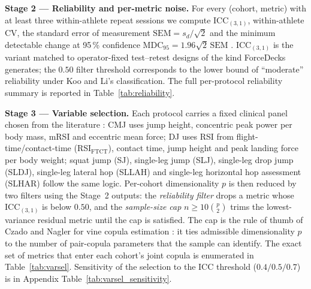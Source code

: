 \documentclass[10pt]{article}
\begin{document}
\textbf{Stage 2 --- Reliability and per-metric noise.}
For every (cohort, metric) with at least three within-athlete repeat
sessions we compute ICC$_{(3,1)}$, within-athlete CV, the standard
error of measurement $\mathrm{SEM} = s_d/\sqrt{2}$ and the minimum
detectable change at 95\,\% confidence
$\mathrm{MDC}_{95} = 1.96\sqrt{2}\,\mathrm{SEM}$
\cite{koo2016icc, weir2005icc}. ICC$_{(3,1)}$ is the variant matched
to operator-fixed test--retest designs of the kind ForceDecks
generates; the $0.50$ filter threshold corresponds to the lower bound
of ``moderate'' reliability under Koo and Li's classification. The
full per-protocol reliability summary is reported in
Table~\ref{tab:reliability}.

\textbf{Stage 3 --- Variable selection.}
Each protocol carries a fixed clinical panel chosen from the
literature \cite{mcmahon2018cmj, flanagan2008rsi, suchomel2015mrsi,
markovic2007metaanalytic, cormack2008reliability, bishop2018asymmetry,
samozino2014fv}: CMJ uses jump height, concentric peak power per body
mass, mRSI and eccentric mean force; DJ uses RSI from
flight-time/contact-time (RSI$_{\text{FTCT}}$), contact time, jump
height and peak landing force per body weight; squat jump (SJ),
single-leg jump (SLJ), single-leg drop jump (SLDJ), single-leg
lateral hop (SLLAH) and single-leg horizontal hop assessment (SLHAR)
follow the same logic. Per-cohort dimensionality $p$ is then reduced
by two filters using the Stage~2 outputs: the \emph{reliability filter}
drops a metric whose ICC$_{(3,1)}$ is below $0.50$, and the
\emph{sample-size cap} $n \!\geq\! 10\binom{p}{2}$ trims the
lowest-variance residual metric until the cap is satisfied. The cap is
the rule of thumb of Czado and Nagler for vine copula estimation
\cite{czado2022vinereview}: it ties admissible dimensionality $p$ to
the number of pair-copula parameters that the sample can identify.
The exact set of metrics that enter each cohort's joint copula is
enumerated in Table~\ref{tab:varsel}. Sensitivity of the selection to
the ICC threshold ($0.4 / 0.5 / 0.7$) is in Appendix
Table~\ref{tab:varsel_sensitivity}.
\end{document}
